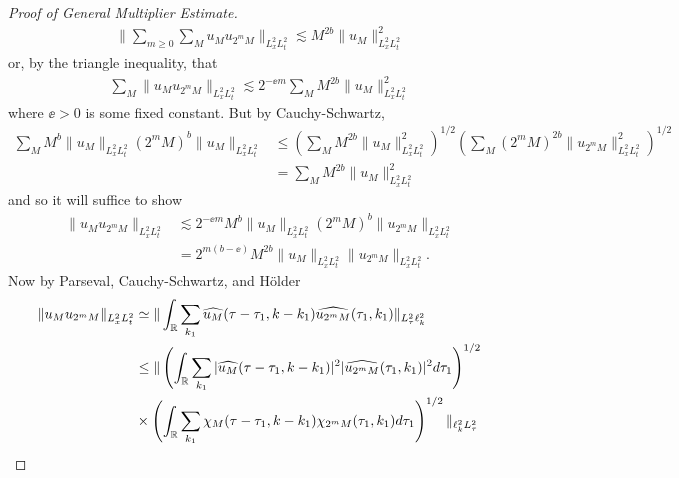 \begin{proof}[Proof of General Multiplier Estimate]
\begin{equation*}
\begin{split}
  \| \sum_{m \ge 0} \sum_{M} u_{M} u_{2^{m}M} \|_{L^{2}_{x}L^{2}_{t}}
  \lesssim M^{2b} \| u_{M} \|_{L^{2}_{x}L^{2}_{t}}^{2}
\end{split}
\end{equation*}
%
%
or, by the triangle inequality, that
%
%
\begin{equation*}
\begin{split}
  \sum_{M} \| u_{M} u_{2^{m}M} \|_{L^{2}_{x}L^{2}_{t}}
\lesssim 2^{-\ee m} \sum_{M} M^{2b} \| u_{M} \|_{L^{2}_{x}L^{2}_{t}}^{2}
\end{split}
\end{equation*}
where $\ee > 0$ is some fixed constant.
But by Cauchy-Schwartz,
%
%
\begin{equation*}
\begin{split}
  \sum_{M} M^{b} \| u_{M} \|_{L^{2}_{x}L^{2}_{t}} (2^{m}M)^{b} \| u_{M} \|_{L^{2}_{x}L^{2}_{t}} 
  & \le (\sum_{M} M^{2b} \| u_{M} \|_{L^{2}_{x}L^{2}_{t}}^{2})^{1/2}
  (\sum_{M} (2^{m}M)^{2b} \| u_{2^{m}M} \|_{L^{2}_{x}L^{2}_{t}}^{2})^{1/2}
  \\
  & = \sum_{M} M^{2b} \| u_{M} \|_{L^{2}_{x}L^{2}_{t}}^{2}
\end{split}
\end{equation*}
%
%
and so it will suffice to show
\begin{equation*}
\begin{split}
\| u_{M} u_{2^{m}M} \|_{L^{2}_{x}L^{2}_{t}}
& \lesssim 2^{-\ee m} M^{b} \| u_{M} \|_{L^{2}_{x}L^{2}_{t}}
(2^{m} M)^{b} \| u_{2^{m} M} \|_{L^{2}_{x}L^{2}_{t}}
\\
& = 2^{m(b - \ee)} M^{2b} \| u_{M} \|_{L^{2}_{x}L^{2}_{t}}
\| u_{2^{m} M} \|_{L^{2}_{x}L^{2}_{t}}.
\end{split}
\end{equation*}
%
Now by Parseval, Cauchy-Schwartz, and H\"older
%
%
\begin{equation*}
\begin{split}
\| u_{M} u_{2^{m}M} \|_{L^{2}_{x}L^{2}_{t}}
& \simeq \| \int_{\rr} \sum_{k_{1}} \wh{u_{M}}(\tau - \tau_{1}, k - k_{1}) \wh{u_{2^{m}M}}(\tau_{1}, k_{1}) \|_{L^{2}_{\tau} \ell^{2}_{k}}
\\
& \le \| \left( \int_{\rr} \sum_{k_{1}} | \wh{u_{M}}(\tau - \tau_{1}, k - k_{1}) |^{2} | \wh{u_{2^{m}M}}(\tau_{1}, k_{1}) |^{2} d \tau_{1} \right)^{1/2} 
\\
& \times \left ( \int_{\rr} \sum_{k_{1}} \chi_{M}(\tau - \tau_{1}, k - k_{1}) \chi_{2^{m}M}(\tau_{1}, k_{1}) d \tau_{1} \right ) ^{1/2} \|_{\ell^{2}_{k} L^{2}_{\tau}}
\\

\end{split}
\end{equation*}
\end{proof}
